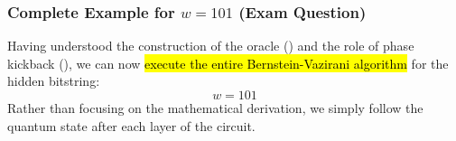 \subsubsection{Complete Example for \texorpdfstring{$w = 101$}{w = 101} (Exam Question)}\label{sec:complete-example-for-w101-exam-question}

Having understood the construction of the oracle () and the role of phase kickback (), we can now \hl{execute the entire Bernstein-Vazirani algorithm} for the hidden bitstring:
\begin{equation*}
    w = 101
\end{equation*}
Rather than focusing on the mathematical derivation, we simply follow the quantum state after each layer of the circuit.


